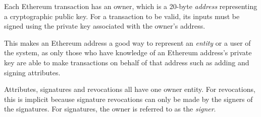 \documentclass[12pt]{report}
\begin{document}
	Each Ethereum transaction has an owner, which is a 20-byte \textit{address} representing a cryptographic public key.\cite{3} For a transaction to be valid, its inputs must be signed using the private key associated with the owner's address.
	
	This makes an Ethereum address a good way to represent an \textit{entity} or a user of the system, as only those who have knowledge of an Ethereum address's private key are able to make transactions on behalf of that address such as adding and signing attributes.
	
	Attributes, signatures and revocations all have one owner entity. For revocations, this is implicit because signature revocations can only be made by the signers of the signatures. For signatures, the owner is referred to as the \textit{signer}.
	
\end{document}
